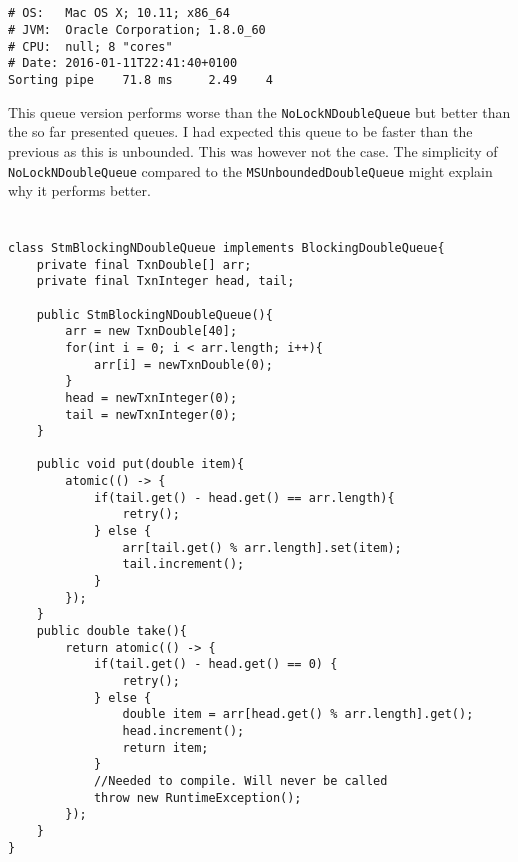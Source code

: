 \documentclass{ituhandin}
\begin{document}
\section{}
\begin{lstlisting}[language={},frame={}]
# OS:   Mac OS X; 10.11; x86_64
# JVM:  Oracle Corporation; 1.8.0_60
# CPU:  null; 8 "cores"
# Date: 2016-01-11T22:41:40+0100
Sorting pipe    71.8 ms     2.49    4
\end{lstlisting}

This queue version performs worse than the \texttt{NoLockNDoubleQueue} but better than the so far presented queues. I had expected this queue to be faster than the previous as this is unbounded. This was however not the case. The simplicity of \texttt{NoLockNDoubleQueue} compared to the \texttt{MSUnboundedDoubleQueue} might explain why it performs better.

\chapter{} %
\section{}
\begin{lstlisting}[caption=Implementation of the \texttt{MSUnboundedDoubleQueue}]
class StmBlockingNDoubleQueue implements BlockingDoubleQueue{
    private final TxnDouble[] arr;
    private final TxnInteger head, tail;

    public StmBlockingNDoubleQueue(){
        arr = new TxnDouble[40];
        for(int i = 0; i < arr.length; i++){
            arr[i] = newTxnDouble(0);
        }
        head = newTxnInteger(0);
        tail = newTxnInteger(0);
    } 

    public void put(double item){
        atomic(() -> {
            if(tail.get() - head.get() == arr.length){
                retry();
            } else {
                arr[tail.get() % arr.length].set(item);
                tail.increment(); 
            } 
        });
    }
    public double take(){ 
        return atomic(() -> {
            if(tail.get() - head.get() == 0) {
                retry();
            } else {
                double item = arr[head.get() % arr.length].get();
                head.increment();
                return item;
            }
            //Needed to compile. Will never be called
            throw new RuntimeException(); 
        });
    }
}
\end{lstlisting}
\section{}
\end{document}
